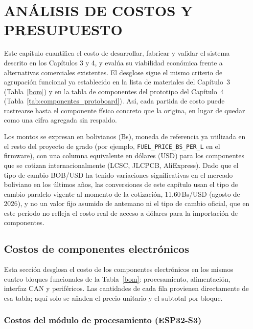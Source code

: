 
\chapter{ANÁLISIS DE COSTOS Y PRESUPUESTO}

Este capítulo cuantifica el costo de desarrollar, fabricar y validar el sistema descrito en los Capítulos 3 y 4, y evalúa su viabilidad económica frente a alternativas comerciales existentes. El desglose sigue el mismo criterio de agrupación funcional ya establecido en la lista de materiales del Capítulo~3 (Tabla~\ref{bom}) y en la tabla de componentes del prototipo del Capítulo~4 (Tabla~\ref{tab:componentes_protoboard}). Así, cada partida de costo puede rastrearse hasta el componente físico concreto que la origina, en lugar de quedar como una cifra agregada sin respaldo.

Los montos se expresan en bolivianos (Bs), moneda de referencia ya utilizada en el resto del proyecto de grado (por ejemplo, \texttt{FUEL\_PRICE\_BS\_PER\_L} en el firmware), con una columna equivalente en dólares (USD) para los componentes que se cotizan internacionalmente (LCSC, JLCPCB, AliExpress). Dado que el tipo de cambio BOB/USD ha tenido variaciones significativas en el mercado boliviano en los últimos años, las conversiones de este capítulo usan el tipo de cambio paralelo vigente al momento de la cotización, 11,60\,Bs/USD (agosto de 2026), y no un valor fijo asumido de antemano ni el tipo de cambio oficial, que en este periodo no refleja el costo real de acceso a dólares para la importación de componentes.

\section{Costos de componentes electrónicos}

Esta sección desglosa el costo de los componentes electrónicos en los mismos cuatro bloques funcionales de la Tabla~\ref{bom}: procesamiento, alimentación, interfaz CAN y periféricos. Las cantidades de cada fila provienen directamente de esa tabla; aquí solo se añaden el precio unitario y el subtotal por bloque.

\subsection{Costos del módulo de procesamiento (ESP32-S3)}

